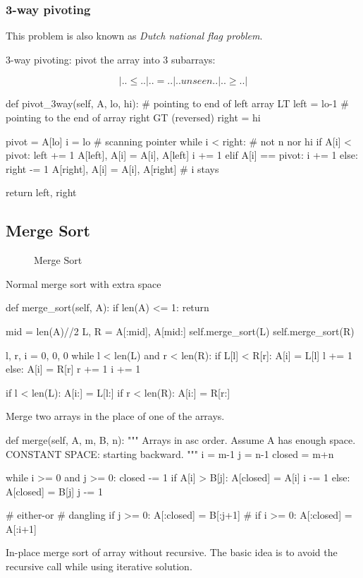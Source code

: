 \subsubsection{3-way pivoting}
This problem is also known as \textit{Dutch national flag problem}.

3-way pivoting: pivot the array into 3 subarrays: 

$$|..\leq..|..=..|..unseen..|..\geq..|$$
\begin{python}
def pivot_3way(self, A, lo, hi):
    # pointing to end of left array LT
    left = lo-1
    # pointing to the end of array right GT (reversed)
    right = hi

    pivot = A[lo]
    i = lo  # scanning pointer
    while i < right:  # not n nor hi
        if A[i] < pivot:
            left += 1
            A[left], A[i] = A[i], A[left]
            i += 1
        elif A[i] == pivot:
            i += 1
        else:
            right -= 1
            A[right], A[i] = A[i], A[right]
            # i stays

    return left, right
\end{python}
\subsection{Merge Sort}
\begin{figure}[!htp]
\centering
{}
\caption{Merge Sort}
\label{fig:msort}
\end{figure}
 Normal merge sort with extra space
\begin{python}
def merge_sort(self, A):
  if len(A) <= 1:
    return

  mid = len(A)//2
  L, R = A[:mid], A[mid:]
  self.merge_sort(L)
  self.merge_sort(R)

  l, r, i = 0, 0, 0
  while l < len(L) and r < len(R):
    if L[l] < R[r]:
      A[i] = L[l]
      l += 1
    else:
      A[i] = R[r]
      r += 1
    i += 1

  if l < len(L):
    A[i:] = L[l:]
  if r < len(R):
    A[i:] = R[r:]
\end{python}

 Merge two arrays in the place of one of the arrays.  
\begin{python}
def merge(self, A, m, B, n):
  """
  Arrays in asc order.
  Assume A has enough space.
  CONSTANT SPACE: starting backward. 
  """
  i = m-1
  j = n-1
  closed = m+n

  while i >= 0 and j >= 0:
    closed -= 1
    if A[i] > B[j]:
      A[closed] = A[i]
      i -= 1
    else:
      A[closed] = B[j]
      j -= 1

  # either-or
  # dangling
  if j >= 0: A[:closed] = B[:j+1]
  # if i >= 0: A[:closed] = A[:i+1]
\end{python}
In-place merge sort of array without recursive. The basic idea is to avoid the recursive call while using iterative solution.


